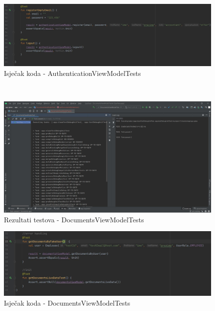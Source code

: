 			\begin{figure}[H]
				\includegraphics[width=\textwidth]{slike/authTests2.jpg}
				\caption{Isječak koda - AuthenticationViewModelTests}
			\end{figure}
			
			\\
			
			\begin{figure}[H]
				\includegraphics[width=\textwidth]{slike/testResultsDocs.jpg}
				\caption{Rezultati testova - DocumentsViewModelTests}
			\end{figure}
			
			\begin{figure}[H]
				\includegraphics[width=\textwidth]{slike/documentsTests.jpg}
				\caption{Isječak koda - DocumentsViewModelTests}
			\end{figure}
			
